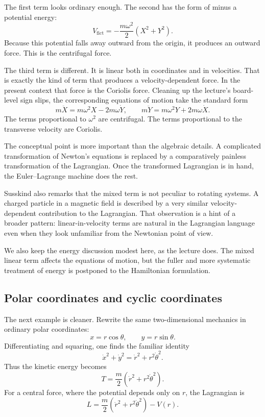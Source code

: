 The first term looks ordinary enough. The second has the form of minus a potential energy:
\begin{equation}
V_{\mathrm{fict}}=-\frac{m\omega^2}{2}\left(X^2+Y^2\right).
\end{equation}
Because this potential falls away outward from the origin, it produces an outward force. This is the centrifugal force.

The third term is different. It is linear both in coordinates and in velocities. That is exactly the kind of term that produces a velocity-dependent force. In the present context that force is the Coriolis force. Cleaning up the lecture's board-level sign slips, the corresponding equations of motion take the standard form
\begin{equation}
m\ddot X=m\omega^2 X-2m\omega \dot Y,
\qquad
m\ddot Y=m\omega^2 Y+2m\omega \dot X.
\end{equation}
The terms proportional to \(\omega^2\) are centrifugal. The terms proportional to the transverse velocity are Coriolis.

The conceptual point is more important than the algebraic details. A complicated transformation of Newton's equations is replaced by a comparatively painless transformation of the Lagrangian. Once the transformed Lagrangian is in hand, the Euler--Lagrange machine does the rest.

Susskind also remarks that the mixed term is not peculiar to rotating systems. A charged particle in a magnetic field is described by a very similar velocity-dependent contribution to the Lagrangian. That observation is a hint of a broader pattern: linear-in-velocity terms are natural in the Lagrangian language even when they look unfamiliar from the Newtonian point of view.

We also keep the energy discussion modest here, as the lecture does. The mixed linear term affects the equations of motion, but the fuller and more systematic treatment of energy is postponed to the Hamiltonian formulation.

\subsection{Polar coordinates and cyclic coordinates}

The next example is cleaner. Rewrite the same two-dimensional mechanics in ordinary polar coordinates:
\begin{equation}
x=r\cos\theta,
\qquad
y=r\sin\theta.
\end{equation}
Differentiating and squaring, one finds the familiar identity
\begin{equation}
\dot x^2+\dot y^2=\dot r^2+r^2\dot\theta^2.
\end{equation}
Thus the kinetic energy becomes
\begin{equation}
T=\frac{m}{2}\left(\dot r^2+r^2\dot\theta^2\right).
\end{equation}
For a central force, where the potential depends only on \(r\), the Lagrangian is
\begin{equation}
L=\frac{m}{2}\left(\dot r^2+r^2\dot\theta^2\right)-V(r).
\end{equation}


